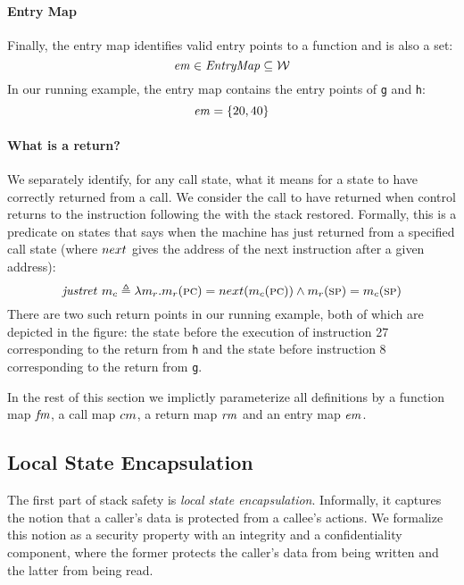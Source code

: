 \documentclass[acmsmall,review,anonymous]{acmart}\settopmatter{printfolios=true,printccs=false,printacmref=false}
\begin{document}
{\paragraph*{Entry Map}
Finally, the entry map identifies valid entry points to a
function and is also a set:
\[\mathit{em} \in \mathit{EntryMap} \subseteq {\mathcal W}\]
%
In our running example, the entry map contains the entry
points of {\tt g} and {\tt h}:
\[ \mathit{em} = \{20, 40\} \]

\paragraph*{What is a return?}

We separately identify, for any call state, what it means for a state
to have correctly returned from a call. We consider the call to have
returned when control returns to the instruction following
the \jal with the stack restored. Formally, this is a predicate on
states that says when the machine has just returned from a specified call state
(where $next$ gives the address of the next instruction after a given address):
\[%
    \ret{\mach_c} \triangleq  \lambda \mach_r . \mach_r(\PCname) =
    \nextPC(\mach_c(\PCname)) \land  \mach_r(\SP) = \mach_c(\SP)
\]
There are two such return points in our running example, both of which
are depicted in the figure: the state before the execution of
instruction 27 corresponding to the return from {\tt h} and the state
before instruction 8 corresponding to the return from {\tt g}.

\medskip

In the rest of this section we implictly parameterize all
definitions by a function map $\mathit{fm}$, a call map $cm$, a return
map $\mathit{rm}$ and an entry map $\mathit{em}$.

\subsection{Local State Encapsulation}
\label{sec:lse}

The first part of stack safety is {\em local state encapsulation}.
Informally, it captures the notion that a caller's data is
protected from a callee's actions. We formalize this notion
as a security property with an integrity and a confidentiality
component, where the former protects the caller's data from being
written and the latter from being read.

}
\end{document}
